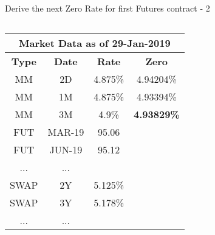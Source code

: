 \documentclass[handout, aspectratio=169]{beamer}
\begin{document}
\begin{frame}{Derive the next Zero Rate for first Futures contract - 2}
	\begin{columns}[T]
		\begin{column}{0.4\textwidth}
			\begin{table}[t]
				\centering
				\begin{adjustbox}{max width=\textwidth, max height=\textheight}
					\begin{tabular}{|c|c|c|c|} 
						\hline
						\multicolumn{4}{|c|}{\textbf{Market Data as of 29-Jan-2019}} \\
						\hline
						\textbf{Type} & \textbf{Date}  & \textbf{Rate} & \textbf{Zero}\\				
						\hline
						MM & 2D & 4.875\% & 4.94204\% \\
						MM & 1M & 4.875\% & 4.93394\% \\
						MM & 3M & 4.9\% & \textbf{4.93829\%}\\
						\hline
						FUT & MAR-19 & 95.06 &\\
						FUT & JUN-19 & 95.12 &\\
						... & ... & &\\
						\hline
						SWAP & 2Y & 5.125\% &\\
						SWAP & 3Y & 5.178\% &\\
						... & ... & &\\
						\hline
					\end{tabular}
				\end{adjustbox}
			\end{table}
		\end{column}
		

\end{columns}
\end{frame}
\end{document}
